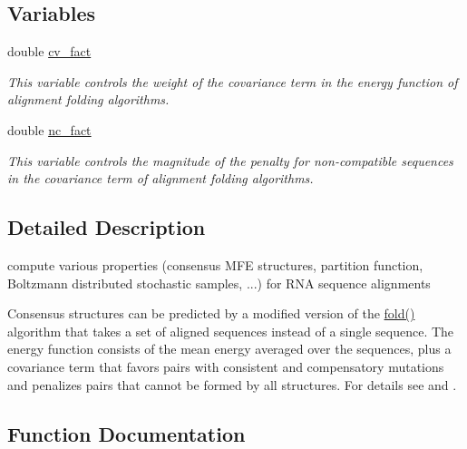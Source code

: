 \subsection*{Variables}
\begin{DoxyCompactItemize}
\item 
double \hyperlink{group__consensus__fold_gaf3cbac6ff5d706d6e414677841ddf94c}{cv\+\_\+fact}
\begin{DoxyCompactList}\small\item\em This variable controls the weight of the covariance term in the energy function of alignment folding algorithms. \end{DoxyCompactList}\item 
double \hyperlink{group__consensus__fold_ga502948a122a2af5b914355b1f3ea2f61}{nc\+\_\+fact}
\begin{DoxyCompactList}\small\item\em This variable controls the magnitude of the penalty for non-\/compatible sequences in the covariance term of alignment folding algorithms. \end{DoxyCompactList}\end{DoxyCompactItemize}


\subsection{Detailed Description}
compute various properties (consensus M\+FE structures, partition function, Boltzmann distributed stochastic samples, ...) for R\+NA sequence alignments 

Consensus structures can be predicted by a modified version of the \hyperlink{group__mfe__fold__single_gaadafcb0f140795ae62e5ca027e335a9b}{fold()} algorithm that takes a set of aligned sequences instead of a single sequence. The energy function consists of the mean energy averaged over the sequences, plus a covariance term that favors pairs with consistent and compensatory mutations and penalizes pairs that cannot be formed by all structures. For details see \cite{hofacker:2002} and \cite{bernhart:2008}. 

\subsection{Function Documentation}
